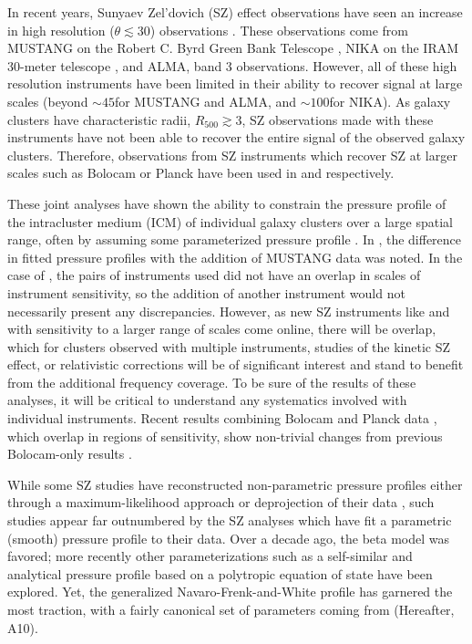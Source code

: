 \documentclass[twocolumn,traditabstract]{aa}
\begin{document}


In recent years, Sunyaev Zel'dovich (SZ) effect observations have seen an increase in high resolution ($\theta \lesssim 30$\asecs)
observations \citep[e.g.][]{mason2010,adam2014,kitayama2016}. These observations come from MUSTANG on the
Robert C. Byrd Green Bank Telescope \citep[GBT][]{dicker2008}, NIKA on the IRAM 30-meter telescope \citep{monfardini2010},
and ALMA, band 3 observations. However, all of these high resolution instruments have been limited in their ability to
recover signal at large scales (beyond $\sim 45$\asecs for MUSTANG and ALMA, and $\sim 100$\asecs for NIKA). As galaxy clusters
have characteristic radii, $R_{500} \gtrsim 3$\amin, SZ observations made with these instruments have not been able to recover the
entire signal of the observed galaxy clusters. Therefore, observations from SZ instruments which recover SZ at larger scales
such as Bolocam \citet{czakon2015} or Planck \citep{planck2013a} have been used in \citet{romero2015a} and \citet{adam2014} respectively.

These joint analyses have shown the ability to constrain the pressure profile of the intracluster medium (ICM) of individual
galaxy clusters over a large spatial range, often by assuming some parameterized pressure profile \citep[e.g.][]{romero2016,adam2014}.
In \citet{romero2015a}, the difference in fitted pressure profiles with the addition of MUSTANG data was noted. In the case of
\citet{romero2016,adam2014}, the pairs of instruments used did not have an overlap in scales of instrument sensitivity, so the
addition of another instrument would not necessarily present any discrepancies. However, as new SZ instruments like
\citep[NIKA2][]{monfardini2014} and \citep[MUSTANG2][]{dicker2014a} with sensitivity to
a larger range of scales come online, there will be overlap, which for clusters observed with
multiple instruments, studies of the kinetic SZ effect, or relativistic corrections \citep{itoh1998} will be of significant interest and
stand to benefit from the additional frequency coverage. To be sure of the results of these analyses, it will be critical to
understand any systematics involved with individual instruments. Recent results combining Bolocam and Planck data \citep{sayers2016},
which overlap in regions of sensitivity, show non-trivial changes from previous Bolocam-only results \citep{sayers2013}.

While some SZ studies have reconstructed non-parametric pressure profiles either through a maximum-likelihood approach
\citep[e.g.][]{ruppin2017} or deprojection of their data \citep[e.g.][]{basu2010,sayers2013}, such studies appear far
outnumbered by the SZ analyses which have fit a parametric (smooth) pressure profile to their data. Over a decade ago, the beta model
\citep{cavaliere1978} was favored; more recently other parameterizations such as a self-similar \citep{mroczkowski2009} and
analytical pressure profile based on a polytropic equation of state \citep{bulbul2010} have been explored. Yet, the
generalized Navaro-Frenk-and-White \citep[gNFW][]{nagai2007} profile has garnered the most traction, with a fairly canonical
set of parameters coming from \citet{arnaud2010} (Hereafter, A10).
\end{document}
